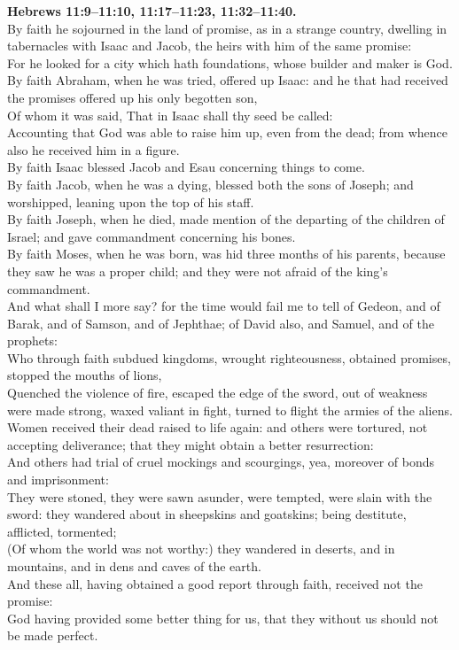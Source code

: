 \documentclass[10pt]{article} %
\begin{document}
{\begin{minipage}[t]{0.45\textwidth}
\textbf{Hebrews 11:9--11:10, 11:17--11:23, 11:32--11:40.}\\
By faith he sojourned in the land of promise, as in a strange country, dwelling in tabernacles with Isaac and Jacob, the heirs with him of the same promise:\\
For he looked for a city which hath foundations, whose builder and maker is God.\\
By faith Abraham, when he was tried, offered up Isaac: and he that had received the promises offered up his only begotten son,\\
Of whom it was said, That in Isaac shall thy seed be called:\\
Accounting that God was able to raise him up, even from the dead; from whence also he received him in a figure.\\
By faith Isaac blessed Jacob and Esau concerning things to come.\\
By faith Jacob, when he was a dying, blessed both the sons of Joseph; and worshipped, leaning upon the top of his staff.\\
By faith Joseph, when he died, made mention of the departing of the children of Israel; and gave commandment concerning his bones.\\
By faith Moses, when he was born, was hid three months of his parents, because they saw he was a proper child; and they were not afraid of the king's commandment.\\
And what shall I more say? for the time would fail me to tell of Gedeon, and of Barak, and of Samson, and of Jephthae; of David also, and Samuel, and of the prophets:\\
Who through faith subdued kingdoms, wrought righteousness, obtained promises, stopped the mouths of lions,\\
Quenched the violence of fire, escaped the edge of the sword, out of weakness were made strong, waxed valiant in fight, turned to flight the armies of the aliens.\\
Women received their dead raised to life again: and others were tortured, not accepting deliverance; that they might obtain a better resurrection:\\
And others had trial of cruel mockings and scourgings, yea, moreover of bonds and imprisonment:\\
They were stoned, they were sawn asunder, were tempted, were slain with the sword: they wandered about in sheepskins and goatskins; being destitute, afflicted, tormented;\\
(Of whom the world was not worthy:) they wandered in deserts, and in mountains, and in dens and caves of the earth.\\
And these all, having obtained a good report through faith, received not the promise:\\
God having provided some better thing for us, that they without us should not be made perfect.
\end{minipage}}
\end{document}
